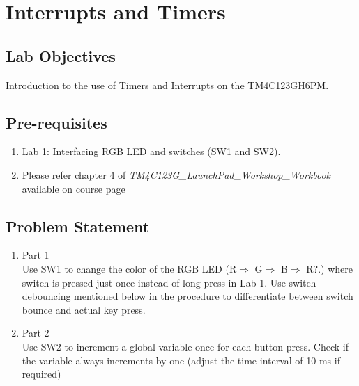 \documentclass[a4paper,12pt,oneside]{book}
\begin{document}
\newpage
\chapter{Interrupts and Timers}
\section{Lab Objectives}
Introduction to the use of Timers and Interrupts on the TM4C123GH6PM.
\section{Pre-requisites}
\begin{enumerate}
\item 
Lab 1: Interfacing RGB LED and switches (SW1 and SW2).
\item Please refer chapter 4 of \textit{TM4C123G\_LaunchPad\_Workshop\_Workbook} available on course page

\end{enumerate}
\section{Problem Statement}
\begin{enumerate}
\item Part 1 \\
Use SW1 to change the color of the RGB LED (R$\Rightarrow$ G$\Rightarrow$ B$\Rightarrow$ R?.) where switch is pressed just once instead of long press in Lab 1. Use switch debouncing mentioned below in the procedure to differentiate between switch bounce and actual key press.
\item Part 2 \\
Use SW2 to increment a global variable once for each button press. Check if the variable always increments by one (adjust the time interval of 10 ms if required)
\end{enumerate}
 
\end{document}
